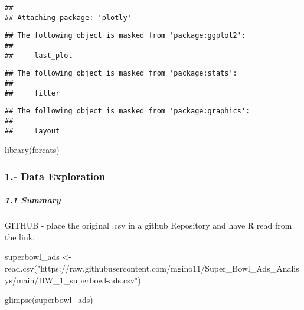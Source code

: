 \documentclass[
]{article}
\newenvironment{Shaded}{\begin{snugshade}}{\end{snugshade}}
\newcommand{\FunctionTok}[1]{\textcolor[rgb]{0.00,0.00,0.00}{#1}}
\newcommand{\NormalTok}[1]{#1}
\newcommand{\OtherTok}[1]{\textcolor[rgb]{0.56,0.35,0.01}{#1}}
\newcommand{\StringTok}[1]{\textcolor[rgb]{0.31,0.60,0.02}{#1}}
\begin{document}
\begin{verbatim}
## 
## Attaching package: 'plotly'
\end{verbatim}

\begin{verbatim}
## The following object is masked from 'package:ggplot2':
## 
##     last_plot
\end{verbatim}

\begin{verbatim}
## The following object is masked from 'package:stats':
## 
##     filter
\end{verbatim}

\begin{verbatim}
## The following object is masked from 'package:graphics':
## 
##     layout
\end{verbatim}

\begin{Shaded}
\begin{Highlighting}[]
\FunctionTok{library}\NormalTok{(forcats)}
\end{Highlighting}
\end{Shaded}

\hypertarget{data-exploration}{%
\subsubsection{1.- Data Exploration}\label{data-exploration}}

\hypertarget{section}{%
\paragraph{}\label{section}}

\hypertarget{summary}{%
\subparagraph{1.1 Summary}\label{summary}}

GITHUB - place the original .csv in a github Repository and have R read
from the link.

\begin{Shaded}
\begin{Highlighting}[]
\NormalTok{superbowl\_ads }\OtherTok{\textless{}{-}}\FunctionTok{read.csv}\NormalTok{(}\StringTok{"https://raw.githubusercontent.com/mgino11/Super\_Bowl\_Ads\_Analisys/main/HW\_1\_superbowl{-}ads.csv"}\NormalTok{)}

\FunctionTok{glimpse}\NormalTok{(superbowl\_ads)}
\end{Highlighting}
\end{Shaded}
\end{document}
